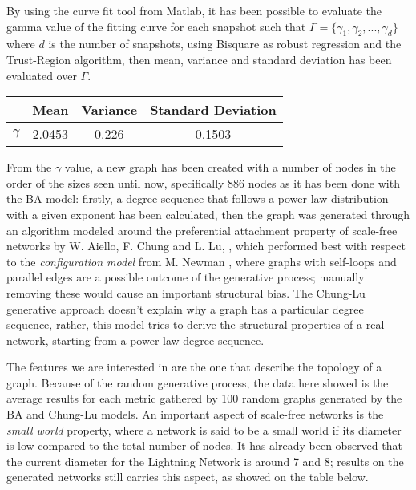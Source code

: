 	By using the curve fit tool from Matlab, it has been possible to evaluate the gamma value of the fitting curve for each snapshot such that $\Gamma = \{\gamma_1, \gamma_2, ... , \gamma_d\}$ where $d$ is the number of snapshots, using Bisquare as robust regression and the Trust-Region algorithm, then mean, variance and standard deviation has been evaluated over $\Gamma$.
	
	\begin{center}
		\begin{tabulary}{0.75\linewidth}{| L | C | C | C | }
			\hline
			& Mean & Variance & Standard Deviation \\ \hline
			$\gamma$ & 2.0453 & 0.226 & 0.1503  \\ \hline
		\end{tabulary}
	\end{center}
	
	
	From the $\gamma$ value, a new graph has been created with a number of nodes in the order of the sizes seen until now, specifically 886 nodes as it has been done with the BA-model: firstly, a degree sequence that follows a power-law distribution with a given exponent has been calculated, then the graph was generated through an algorithm modeled around the preferential attachment property of scale-free networks by W. Aiello, F. Chung and L. Lu, \cite{Aiello2001} \cite{Chung2002}, which performed best with respect to the \textit{configuration model} from M. Newman \cite{Newman2003}, where graphs with self-loops and parallel edges are a possible outcome of the generative process; manually removing these would cause an important structural bias. The Chung-Lu generative approach doesn't explain why a graph has a particular degree sequence, rather, this model tries to derive the structural properties of a real network, starting from a power-law degree sequence.
	
	The features we are interested in are the one that describe the topology of a graph. Because of the random generative process, the data here showed is the average results for each metric gathered by 100 random graphs generated by the BA and Chung-Lu models. An important aspect of scale-free networks is the \textit{small world} property, where a network is said to be a small world if its diameter is low compared to the total number of nodes. It has already been observed that the current diameter for the Lightning Network is around 7 and 8; results on the generated networks still carries this aspect, as showed on the table below.
	
